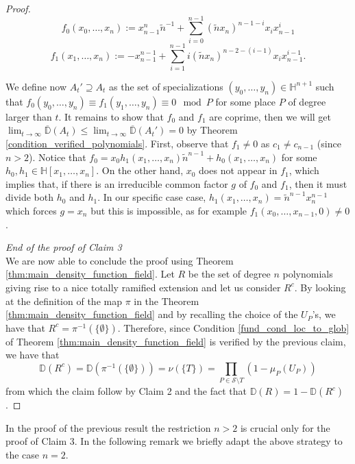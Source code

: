 \documentclass[10pt]{amsart}
\newcommand{\vH}{\mathbb{H}}
\newcommand{\vD}{\mathbb{D}}
\newcommand{\cS}{\mathcal{S}}
\theoremstyle{definition}
\theoremstyle{remark}
\numberwithin{equation}{section}
\begin{document}
\begin{proof}
\[f_0(x_0,\dots,x_n):=x^n_{n-1}\tilde n^{-1}+\sum^{n-1}_{i=0} (\tilde n x_n)^{n-1-i} x_i x_{n-1}^i\]
\[f_1(x_1,\dots,x_n):=-x^{n-1}_{n-1}+\sum^{n-1}_{i=1} i(\tilde n x_n)^{n-2-(i-1)} x_i x_{n-1}^{i-1}.\]

We define now $A_t'\supseteq A_t$ as the set of specializations $(y_0,\dots,y_n)\in \vH^{n+1}$ such that
$f_0(y_0,\dots,y_n)\equiv f_1(y_1,\dots,y_n)\equiv 0 \mod P$ for some place $P$ of degree larger than $t$.
It remains to show that $f_0$ and $f_1$ are coprime, then we will get $\lim_{t\rightarrow \infty}\overline{\vD}(A_t)\leq \lim_{t\rightarrow \infty}\overline{\vD}(A_t')=0$ by Theorem \ref{condition_verified_polynomials}. First, observe that $f_1\neq 0$ as $c_1\neq c_{n-1}$ (since $n>2$).
Notice that $f_0=x_0 h_1(x_1,\dots,x_n) \tilde n^{n-1}+h_0(x_1,\dots,x_n)$ for some $h_0, h_1\in \vH[x_1,\dots, x_n]$. On the other hand, $x_0$ does not appear in $f_1$, which implies that, if there is an irreducible common factor $g$ of $f_0$ and $f_1$, then
it must divide both $h_0$ and $h_1$. In our specific case case, $h_1(x_1,\dots,x_n)=\tilde n^{n-1}x_n^{n-1}$ which forces $g=x_n$ but this is impossible, as 
for example $f_1(x_0,\dots,x_{n-1},0)\neq 0$. 

\emph{End of the proof of Claim 3}\\
We are now able to conclude the proof using Theorem \ref{thm:main_density_function_field}.
Let $R$ be the set of degree $n$ polynomials giving rise to a nice totally ramified extension and let us consider $R^c$.
By looking at the definition of the map $\pi$ in the Theorem \ref{thm:main_density_function_field} and by recalling the choice of the $U_P$'s, we have that 
$R^c=\pi^{-1}(\{\emptyset\})$.
Therefore, since Condition \eqref{fund_cond_loc_to_glob} of Theorem \ref{thm:main_density_function_field} is verified by the previous claim, we have that
\[\vD(R^c)=\vD(\pi^{-1}(\{\emptyset\}))=\nu(\{T\})=\prod_{P\in \cS\setminus T } (1-\mu_P(U_P))\]
from which the claim follow by Claim 2 and the fact that $\vD(R)=1-\vD(R^c)$.


\end{proof}

In the proof of the previous result the restriction $n>2$ is crucial only for the proof of Claim 3. In the following remark we briefly adapt the above strategy to the case $n=2$. 
\end{document}

